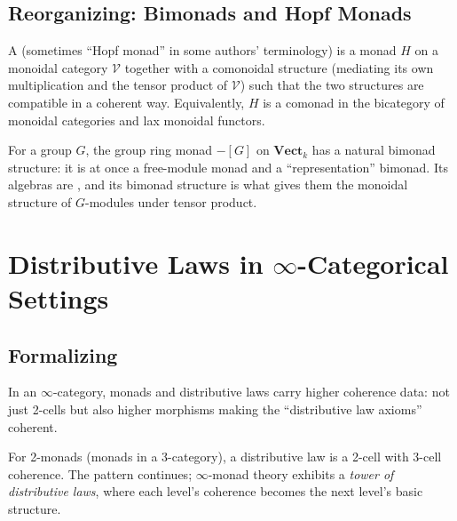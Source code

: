 \subsection{Reorganizing: Bimonads and Hopf Monads}

\begin{definition}[Bimonad]
\label{def:bimonad}
A  (sometimes ``Hopf monad'' in some authors' terminology) is
a monad $H$ on a monoidal category $\mathcal{V}$ together with a comonoidal
structure (mediating its own multiplication and the tensor product of
$\mathcal{V}$) such that the two structures are compatible in a coherent
way. Equivalently, $H$ is a comonad in the bicategory of monoidal categories
and lax monoidal functors.
\end{definition}

\begin{example_thm}
For a group $G$, the group ring monad $-{[G]}$ on $\mathbf{Vect}_k$ has a
natural bimonad structure: it is at once a free-module monad and a
``representation'' bimonad. Its algebras are , and its
bimonad structure is what gives them the monoidal structure of $G$-modules
under tensor product.
\end{example_thm}


\section{Distributive Laws in $\infty$-Categorical Settings}
\label{sec:dist-infty}

\subsection{Formalizing}

In an $\infty$-category, monads and distributive laws carry higher
coherence data: not just 2-cells but also higher morphisms making the
``distributive law axioms'' coherent.

\begin{remark}
For 2-monads (monads in a 3-category), a distributive law is a 2-cell with
3-cell coherence. The pattern continues; $\infty$-monad theory exhibits a
\emph{tower of distributive laws}, where each level's coherence becomes the
next level's basic structure.
\end{remark}

